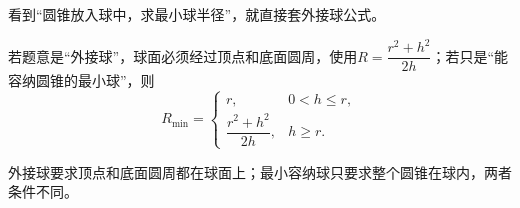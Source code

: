 \begin{trapbox}
	\medskip
	\begin{description}[style=nextline, leftmargin=2.8em, labelsep=0.5em, itemsep=0.35em]
		\item[\textbf{\textcolor{CTrap}{易错点五（外接球与最小容纳球混淆）：}}] 看到“圆锥放入球中，求最小球半径”，就直接套外接球公式。
		\item[\textbf{\textcolor{CTrap}{正确理解（先看题意）：}}] 若题意是“外接球”，球面必须经过顶点和底面圆周，使用$R=\dfrac{r^2+h^2}{2h}$；若只是“能容纳圆锥的最小球”，则
		      \[
			      R_{\min}=\begin{cases}
				      r,                   & 0<h\le r, \\[4pt]
				      \dfrac{r^2+h^2}{2h}, & h\ge r.
			      \end{cases}
		      \]
		\item[\textbf{\textcolor{CTrap}{错因分析（概念混用）：}}] 外接球要求顶点和底面圆周都在球面上；最小容纳球只要求整个圆锥在球内，两者条件不同。
	\end{description}
\end{trapbox}